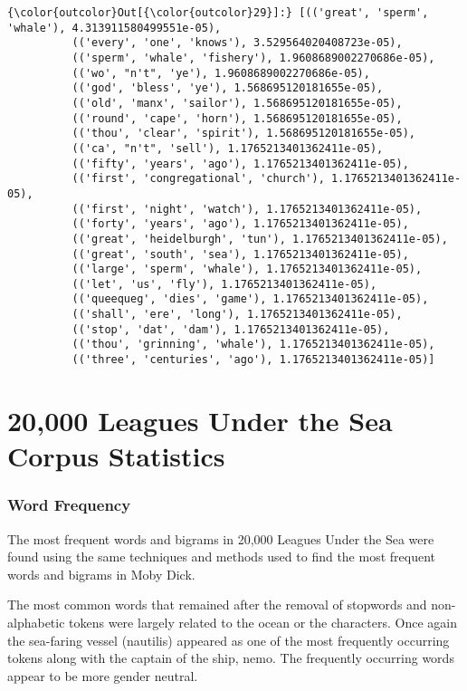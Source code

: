 \documentclass[11pt]{article}
\begin{document}
\begin{Verbatim}[commandchars=\\\{\}]
{\color{outcolor}Out[{\color{outcolor}29}]:} [(('great', 'sperm', 'whale'), 4.313911580499551e-05),
          (('every', 'one', 'knows'), 3.529564020408723e-05),
          (('sperm', 'whale', 'fishery'), 1.9608689002270686e-05),
          (('wo', "n't", 'ye'), 1.9608689002270686e-05),
          (('god', 'bless', 'ye'), 1.568695120181655e-05),
          (('old', 'manx', 'sailor'), 1.568695120181655e-05),
          (('round', 'cape', 'horn'), 1.568695120181655e-05),
          (('thou', 'clear', 'spirit'), 1.568695120181655e-05),
          (('ca', "n't", 'sell'), 1.1765213401362411e-05),
          (('fifty', 'years', 'ago'), 1.1765213401362411e-05),
          (('first', 'congregational', 'church'), 1.1765213401362411e-05),
          (('first', 'night', 'watch'), 1.1765213401362411e-05),
          (('forty', 'years', 'ago'), 1.1765213401362411e-05),
          (('great', 'heidelburgh', 'tun'), 1.1765213401362411e-05),
          (('great', 'south', 'sea'), 1.1765213401362411e-05),
          (('large', 'sperm', 'whale'), 1.1765213401362411e-05),
          (('let', 'us', 'fly'), 1.1765213401362411e-05),
          (('queequeg', 'dies', 'game'), 1.1765213401362411e-05),
          (('shall', 'ere', 'long'), 1.1765213401362411e-05),
          (('stop', 'dat', 'dam'), 1.1765213401362411e-05),
          (('thou', 'grinning', 'whale'), 1.1765213401362411e-05),
          (('three', 'centuries', 'ago'), 1.1765213401362411e-05)]
\end{Verbatim}
            
    \section{20,000 Leagues Under the Sea Corpus
Statistics}\label{leagues-under-the-sea-corpus-statistics}

    \subsubsection{Word Frequency}\label{word-frequency}

The most frequent words and bigrams in 20,000 Leagues Under the Sea were
found using the same techniques and methods used to find the most
frequent words and bigrams in Moby Dick.

The most common words that remained after the removal of stopwords and
non-alphabetic tokens were largely related to the ocean or the
characters. Once again the sea-faring vessel (nautilis) appeared as one
of the most frequently occurring tokens along with the captain of the
ship, nemo. The frequently occurring words appear to be more gender
neutral.
\end{document}
